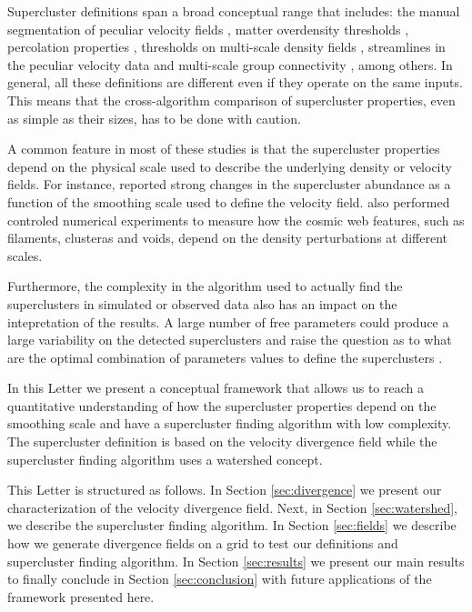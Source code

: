 \documentclass[usenatbib]{mnras}
\begin{document}
Supercluster definitions span a broad conceptual range that includes: the manual segmentation of peculiar velocity fields  \citep{2014Natur.513...71T}, matter overdensity thresholds \citep{2015A&A...575L..14C}, percolation properties \citep{Bagchi_2017}, thresholds on multi-scale density fields \citep{Einasto_2019}, streamlines in the peculiar velocity data \citep{Dupuy_2019} and multi-scale group connectivity \citep{2020A&A...641A.172E}, among others.
In general, all these definitions are different even if they operate on the same inputs. 
This means that the cross-algorithm comparison of supercluster properties, even as simple as their sizes, has to be done with caution.

A common feature in most of these studies is that the supercluster properties depend on the physical scale used to describe the
underlying density or velocity fields.
For instance, \cite{Dupuy_2020} reported strong changes in the supercluster abundance as a function of the smoothing scale used to define the velocity field.
\cite{2011A&A...531A.149S} also performed controled numerical experiments to measure how the cosmic web features, such as filaments, clusteras and voids, depend on the density perturbations at different scales.

Furthermore, the complexity in the algorithm used to actually find the superclusters in simulated or observed data also has an impact on the intepretation of the results.
A large number of free parameters could produce a large variability on the detected superclusters and raise the question as to what are the optimal combination of parameters values to define the superclusters \citep{Dupuy_2020}.


In this Letter we present a conceptual framework that allows us to reach a quantitative understanding of how the supercluster properties depend on the smoothing scale and have a supercluster finding algorithm with low complexity.
The supercluster definition is based on the velocity divergence field while the supercluster finding algorithm uses a watershed concept.

This Letter is structured as follows.
In Section \ref{sec:divergence} we present our characterization of the velocity divergence field.
Next, in Section \ref{sec:watershed}, we describe the supercluster finding algorithm.
In Section \ref{sec:fields} we describe how we generate divergence fields on a grid to test our definitions and supercluster finding algorithm.
In Section \ref{sec:results} we present our main results to finally conclude in Section \ref{sec:conclusion} with future applications of the framework presented here.
\end{document}
